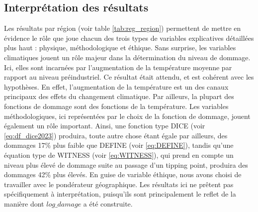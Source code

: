 




\subsection{Interprétation des résultats}


Les résultats par région (voir table \ref{tab:reg_region}) permettent de mettre en évidence le rôle que joue chacun des trois types de variables explicatives détaillées plus haut : physique, méthodologique et éthique. 
Sans surprise, les variables climatiques jouent un rôle majeur dans la détermination du niveau de dommage. Ici, elles sont incarnées par l'augmentation de la température moyenne par rapport au niveau préindustriel. Ce résultat était attendu, et est cohérent avec les hypothèses. En effet, l'augmentation de la température est un des canaux principaux des effets du changement climatique. Par ailleurs, la plupart des fonctions de dommage sont des fonctions de la température. 
Les variables méthodologiques, ici représentées par le choix de la fonction de dommage, jouent également un rôle important. Ainsi, une fonction type DICE (voir \ref{eq:df_dice2023}) produira, toute autre chose étant égale par ailleurs, des dommages 17\% plus faible que DEFINE (voir \ref{eq:DEFINE}), tandis qu'une équation type de WITNESS (voir \ref{eq:WITNESS}), qui prend en compte un niveau plus élevé de dommage suite au passage d'un tipping point, produira des dommages 42\% plus élevés. 
En guise de variable éthique, nous avons choisi de travailler avec le pondérateur géographique. Les résultats ici ne prêtent pas spécifiquement à interprétation, puisqu'ils sont principalement le reflet de la manière dont $log\_damage$ a été construite. \\

